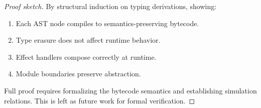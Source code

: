 \begin{proof}[Proof sketch]
By structural induction on typing derivations, showing:
\begin{enumerate}
  \item Each AST node compiles to semantics-preserving bytecode.
  \item Type erasure does not affect runtime behavior.
  \item Effect handlers compose correctly at runtime.
  \item Module boundaries preserve abstraction.
\end{enumerate}
Full proof requires formalizing the bytecode semantics and establishing simulation relations. This is left as future work for formal verification.
\end{proof}

